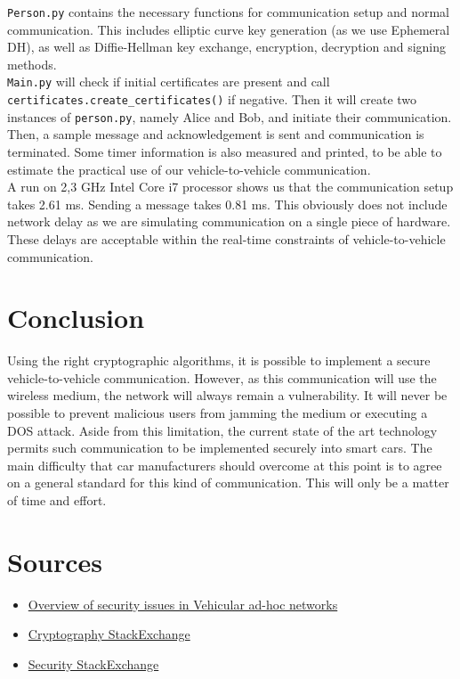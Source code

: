 \documentclass[a4paper, 11pt]{article}
\begin{document}
\texttt{Person.py} contains the necessary functions for communication setup and
normal communication. This includes elliptic curve key generation (as we use
Ephemeral DH), as well as Diffie-Hellman key exchange, encryption, decryption
and signing methods.\\

\texttt{Main.py} will check if initial certificates are present and call
\texttt{certificates.create\_certificates()} if negative. Then it will create
two instances of \texttt{person.py}, namely Alice and Bob, and initiate their
communication. Then, a sample message and acknowledgement is sent and
communication is terminated. Some timer information is also measured and
printed, to be able to estimate the practical use of our vehicle-to-vehicle
communication.\\

A run on 2,3 GHz Intel Core i7 processor shows us that the communication setup
takes 2.61 ms. Sending a message takes 0.81 ms. This obviously does not include
network delay as we are simulating communication on a single piece of hardware.
These delays are acceptable within the real-time constraints of
vehicle-to-vehicle communication.



\section{Conclusion}
Using the right cryptographic algorithms, it is possible to implement a secure
vehicle-to-vehicle communication. However, as this communication will use the
wireless medium, the network will always remain a vulnerability. It will never
be possible to prevent malicious users from jamming the medium or executing a
DOS attack. Aside from this limitation, the current state of the art technology
permits such communication to be implemented securely into smart cars. The main
difficulty that car manufacturers should overcome at this point is to agree on a
general standard for this kind of communication. This will only be a matter of time and effort.

\section{Sources}
\begin{itemize}
  \item \href{http://orff.uc3m.es/bitstream/handle/10016/9395/Overview-VANET-security-issues-earchivo.pdf?sequence=1}{Overview of security issues in Vehicular ad-hoc networks}
  \item \href{https://crypto.stackexchange.com}{Cryptography StackExchange}
  \item \href{https://security.stackexchange.com}{Security StackExchange}
\end{itemize}
\end{document}
